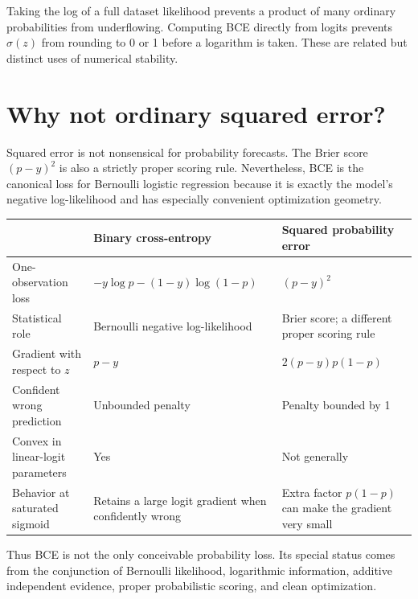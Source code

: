 \documentclass[11pt]{article}
\newcommand{\rowrule}{\specialrule{0.20pt}{1.25pt}{1.25pt}}
\newcommand{\sigmoid}{\sigma}
\theoremstyle{definition}
\begin{document}
\begin{warningbox}
Taking the log of a full dataset likelihood prevents a product of many ordinary probabilities from underflowing. Computing BCE directly from logits prevents $\sigmoid(z)$ from rounding to 0 or 1 before a logarithm is taken. These are related but distinct uses of numerical stability.
\end{warningbox}

\section{Why not ordinary squared error?}

Squared error is not nonsensical for probability forecasts. The Brier score $(p-y)^2$ is also a strictly proper scoring rule. Nevertheless, BCE is the canonical loss for Bernoulli logistic regression because it is exactly the model's negative log-likelihood and has especially convenient optimization geometry.

\begin{center}
\begin{tabularx}{0.96\textwidth}{>{\raggedright\arraybackslash}p{}XX}
\toprule
& \textbf{Binary cross-entropy} & \textbf{Squared probability error} \\
\midrule
One-observation loss & $-y\log p-(1-y)\log(1-p)$ & $(p-y)^2$ \\
\rowrule
Statistical role & Bernoulli negative log-likelihood & Brier score; a different proper scoring rule \\
\rowrule
Gradient with respect to $z$ & $p-y$ & $2(p-y)p(1-p)$ \\
\rowrule
Confident wrong prediction & Unbounded penalty & Penalty bounded by 1 \\
\rowrule
Convex in linear-logit parameters & Yes & Not generally \\
\rowrule
Behavior at saturated sigmoid & Retains a large logit gradient when confidently wrong & Extra factor $p(1-p)$ can make the gradient very small \\
\bottomrule
\end{tabularx}
\end{center}

Thus BCE is not the only conceivable probability loss. Its special status comes from the conjunction of Bernoulli likelihood, logarithmic information, additive independent evidence, proper probabilistic scoring, and clean optimization.
\end{document}
